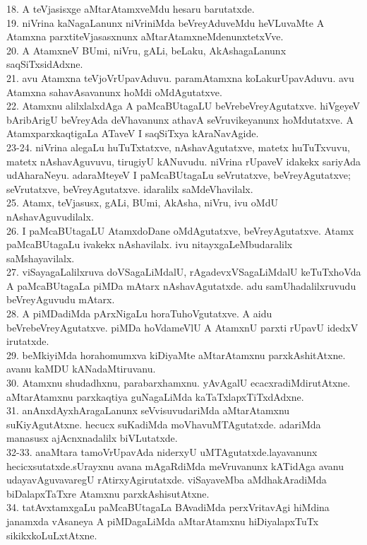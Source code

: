 \documentclass{article}
\begin{document}
18. A teVjasisxge aMtarAtamxveMdu hesaru barutatxde.\\
19. niVrina kaNagaLanunx niVriniMda beVreyAduveMdu heVLuvaMte A Atamxna parxtiteVjasasxnunx aMtarAtamxneMdenunxtetxVve.\\
20. A AtamxneV BUmi, niVru, gALi, beLaku, AkAshagaLanunx saqSiTxsidAdxne.\\
21. avu Atamxna teVjoVrUpavAduvu. paramAtamxna koLakurUpavAduvu. avu Atamxna sahavAsavanunx hoMdi oMdAgutatxve.\\
22. Atamxnu alilxlalxdAga A paMcaBUtagaLU beVrebeVreyAgutatxve. hiVgeyeV bAribArigU beVreyAda deVhavanunx athavA seVruvikeyanunx hoMdutatxve. A AtamxparxkaqtigaLa ATaveV I saqSiTxya kAraNavAgide.\\
23-24. niVrina alegaLu huTuTxtatxve, nAshavAgutatxve, matetx huTuTxvuvu, matetx nAshavAguvuvu, tirugiyU kANuvudu. niVrina rUpaveV idakekx sariyAda udAharaNeyu. adaraMteyeV I paMcaBUtagaLu seVrutatxve, beVreyAgutatxve; seVrutatxve, beVreyAgutatxve. idaralilx saMdeVhavilalx.\\
25. Atamx, teVjasusx, gALi, BUmi, AkAsha, niVru, ivu oMdU nAshavAguvudilalx.\\
26. I paMcaBUtagaLU AtamxdoDane oMdAgutatxve, beVreyAgutatxve. Atamx paMcaBUtagaLu ivakekx nAshavilalx. ivu nitayxgaLeMbudaralilx saMshayavilalx.\\
27. viSayagaLalilxruva doVSagaLiMdalU, rAgadevxVSagaLiMdalU keTuTxhoVda A paMcaBUtagaLa piMDa mAtarx nAshavAgutatxde. adu samUhadalilxruvudu beVreyAguvudu mAtarx.\\
28. A piMDadiMda pArxNigaLu horaTuhoVgutatxve. A aidu beVrebeVreyAgutatxve. piMDa hoVdameVlU A AtamxnU parxti rUpavU idedxV irutatxde.\\
29. beMkiyiMda horahomumxva kiDiyaMte aMtarAtamxnu parxkAshitAtxne. avanu kaMDU kANadaMtiruvanu.\\
30. Atamxnu shudadhxnu, parabarxhamxnu. yAvAgalU ecacxradiMdirutAtxne. aMtarAtamxnu parxkaqtiya guNagaLiMda kaTaTxlapxTiTxdAdxne.\\
31. anAnxdAyxhAragaLanunx seVvisuvudariMda aMtarAtamxnu suKiyAgutAtxne. hecucx  suKadiMda moVhavuMTAgutatxde. adariMda manasusx ajAcnxnadalilx biVLutatxde.\\
32-33. anaMtara tamoVrUpavAda niderxyU uMTAgutatxde.layavanunx hecicxsutatxde.sUrayxnu avana mAgaRdiMda meVruvanunx kATidAga avanu udayavAguvavaregU rAtirxyAgirutatxde. viSayaveMba aMdhakAradiMda biDalapxTaTxre Atamxnu parxkAshisutAtxne.\\
34. tatAvxtamxgaLu paMcaBUtagaLa BAvadiMda perxVritavAgi hiMdina janamxda vAsaneya A piMDagaLiMda aMtarAtamxnu hiDiyalapxTuTx sikikxkoLuLxtAtxne.\\
\end{document}
